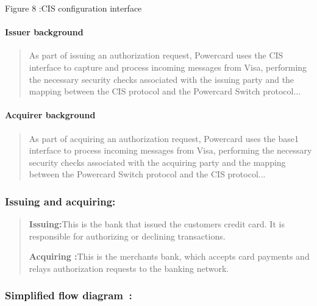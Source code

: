 \documentclass[12pt,a4paper]{report}
\begin{document}
\protect\hypertarget{_Toc201954484}{}{}Figure 8 :CIS configuration
interface

\hypertarget{issuer-background}{%
\paragraph{\texorpdfstring{\textbf{Issuer
background}}{Issuer background}}\label{issuer-background}}

\begin{quote}
As part of issuing an authorization request, Powercard uses the CIS
interface to capture and process incoming messages from Visa, performing
the necessary security checks associated with the issuing party and the
mapping between the CIS protocol and the Powercard Switch protocol...
\end{quote}

\hypertarget{acquirer-background}{%
\paragraph{\texorpdfstring{\textbf{Acquirer
background}}{Acquirer background}}\label{acquirer-background}}

\begin{quote}
As part of acquiring an authorization request, Powercard uses the base1
interface to process incoming messages from Visa, performing the
necessary security checks associated with the acquiring party and the
mapping between the Powercard Switch protocol and the CIS protocol...
\end{quote}

\hypertarget{issuing-and-acquiring}{%
\subsubsection{\texorpdfstring{\textbf{Issuing and
acquiring:}}{Issuing and acquiring:}}\label{issuing-and-acquiring}}

\begin{quote}
\textbf{Issuing:}This is the bank that issued the
customer\textquotesingle s credit card. It is responsible for
authorizing or declining transactions.

\textbf{Acquiring :}This is the merchant\textquotesingle s bank, which
accepts card payments and relays authorization requests to the banking
network.
\end{quote}


\subsubsection{\texorpdfstring{\textbf{Simplified flow
diagram~:}}{Simplified flow diagram~:}}\label{simplified-flow-diagram}
\end{document}

